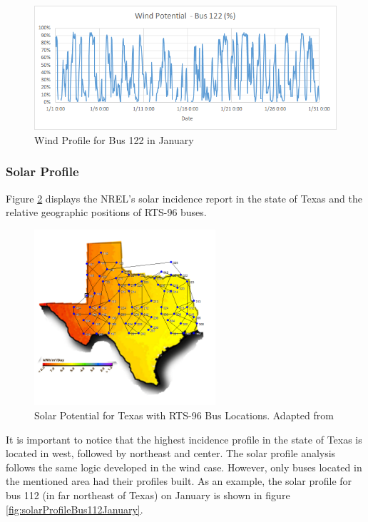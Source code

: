 \documentclass[12pt,LUDisStyle,twosided]{book}
\begin{document}
\begin{figure}[h!] 
  \includegraphics[width=\textwidth,keepaspectratio]{windPotentialBus122.png}
  \caption{Wind Profile for Bus 122 in January}
  \label{fig:windProfileBus122January}
\end{figure}

\subsubsection{Solar Profile}

Figure \ref{fig:texasSolarProfile} displays the NREL's solar incidence report in the state of Texas and the relative geographic positions of RTS-96 buses. 

\begin{figure}[h!] 
	\begin{center}
		\includegraphics[width=0.6\textwidth,keepaspectratio]{texasSolarProfileWithBuses.png}
	  	\caption{Solar Potential for Texas with RTS-96 Bus Locations. Adapted from \cite{texasSolarProfile} }	  				        \label{fig:texasSolarProfile}
	\end{center}
\end{figure}


It is important to notice that the highest incidence profile in the state of Texas is located in west, followed by northeast and center. The solar profile analysis follows the same logic developed in the wind case. However, only buses located in the mentioned area had their profiles built. As an example, the solar profile for bus 112 (in far northeast of Texas) on January is shown in figure \ref{fig:solarProfileBus112January}.
\end{document}

